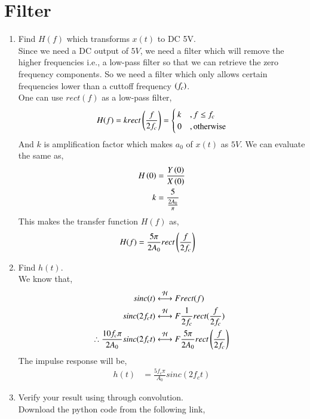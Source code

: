 \documentclass[journal,12pt,twocolumn]{IEEEtran}
\renewcommand\thesection{\arabic{section}}
\begin{document}
\section{Filter}\begin{enumerate}[label=\thesection.\arabic*
,ref=\thesection.\theenumi]
\item Find $H(f)$ which transforms $x(t)$ to DC 5V. \\
	\solution Since we need a DC output of $5V$, we need a filter which will remove the higher frequencies i.e., a low-pass filter so that we can retrieve the zero frequency components. So we need a filter which only allows certain frequencies lower than a cuttoff frequency $\left(f_c\right)$. \\
	One can use $rect(f)$ as a low-pass filter,
	 \begin{align}
		 H(f) = krect\left(\frac{f}{2f_c}\right) = \begin{cases}
			                                 k  &, f \leq f_c \\
							 0  &, \text{otherwise}
						     \end{cases}
	 \end{align}
	 And $k$ is amplification factor which makes $a_0$ of $x(t)$ as $5V$. We can evaluate the same as,
	  \begin{align}
		  H\left(0\right) &= \frac{Y\left(0\right)}{X\left(0\right)} \\
		    k    &= \frac{5}{\frac{2A_0}{\pi}} 
	  \end{align}
	  This makes the transfer function $H(f)$ as,
	   \begin{align}
		   H(f) &= \frac{5\pi}{2A_0}rect\left(\frac{f}{2f_c}\right)
	   \end{align}
\item Find $h(t)$.\\
 \solution We know that,
  \begin{align}
	  sinc(t) &\overset{\mathcal{H}}{ \longleftrightarrow}{F} rect(f) \\
	  sinc(2f_ct) &\overset{\mathcal{H}}{ \longleftrightarrow}{F} \frac{1}{2f_c}rect(\frac{f}{2f_c})\\
	  \therefore \frac{10f_c\pi}{2A_0}sinc(2f_ct) &\overset{\mathcal{H}}{ \longleftrightarrow}{F} \frac{5\pi}{2A_0}rect\left(\frac{f}{2f_c}\right)
  \end{align}
  The impulse response will be,
   \begin{align}
	   h(t) &= \frac{5f_c \pi}{A_0}sinc(2f_ct)
   \end{align}
\item Verify your result using  through convolution. \\
 \solution Download the python code from the following link,

\end{enumerate}
\end{document}
